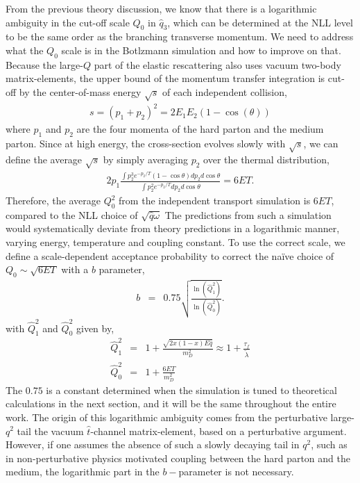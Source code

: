 From the previous theory discussion, we know that there is a logarithmic ambiguity in the cut-off scale $Q_0$ in $\hat{q}_3$, which can be determined at the NLL level to be the same order as the branching transverse momentum.
We need to address what the $Q_0$ scale is in the Botlzmann simulation and how to improve on that.
Because the large-$Q$ part of the elastic rescattering also uses vacuum two-body matrix-elements, the upper bound of the momentum transfer integration is cut-off by the center-of-mass energy $\sqrt{s}$ of each independent collision,
\begin{eqnarray}
s = (p_1 + p_2)^2 = 2E_1 E_2 (1-\cos(\theta))
\end{eqnarray}
where $p_1$ and $p_2$ are the four momenta of the hard parton and the medium parton.
Since at high energy, the cross-section evolves slowly with $\sqrt{s}$, we can define the average $\sqrt{s}$ by simply averaging $p_2$ over the thermal distribution,
\begin{eqnarray}
2p_1\frac{ \int p_2^3 e^{-p_2/T}(1-\cos\theta) dp_2 d\cos \theta }{\int p_2^2 e^{-p_2/T} dp_2 d\cos \theta} =  6ET.
\end{eqnarray}
Therefore, the average $Q_0^2$ from the independent transport simulation is $6ET$, compared to the NLL choice of $\sqrt{\hat{q} \omega}$
The predictions from such a simulation would systematically deviate from theory predictions in a logarithmic manner, varying energy, temperature and coupling constant.
To use the correct scale, we define a scale-dependent acceptance probability to correct the na\"ive choice of $Q_0 \sim \sqrt{6ET}$ with a $b$ parameter,
\begin{eqnarray}
b &=& 0.75\sqrt{\frac{\ln(\hat{Q}_1^2 )}{\ln(\hat{Q}_0^2 )}}.
\label{eq:NLL-b}
\end{eqnarray}
with $\hat{Q}_1^2$ and $\hat{Q}_0^2$ given by,
\begin{eqnarray}
\hat{Q}_1^2 &=& 1 + \frac{\sqrt{2x(1-x)E\hat{q}}}{m_D^2} \approx 1 + \frac{\tau_f}{\tilde{\lambda}}\\
\hat{Q}_0^2 &=& 1 + \frac{6ET}{m_D^2}
\end{eqnarray}
The $0.75$ is a constant determined when the simulation is tuned to theoretical calculations in the next section, and it will be the same throughout the entire work.
The origin of this logarithmic ambiguity comes from the perturbative large-$q^2$ tail the vacuum $\hat{t}$-channel matrix-element, based on a perturbative argument. 
However, if one assumes the absence of such a slowly decaying tail in $q^2$, such as in non-perturbative physics motivated coupling between the hard parton and the medium, the logarithmic part in the $b-$parameter is not necessary.

